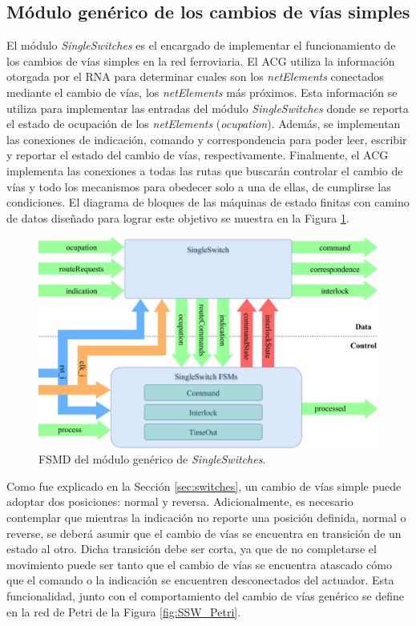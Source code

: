 \subsection{Módulo genérico de los cambios de vías simples}
	\label{sec:ACG_ssw}
	
	El módulo \textit{SingleSwitches} es el encargado de implementar el funcionamiento de los cambios de vías simples en la red ferroviaria. El ACG utiliza la información otorgada por el RNA para determinar cuales son los \textit{netElements} conectados mediante el cambio de vías, los \textit{netElements} más próximos. Esta información se utiliza para implementar las entradas del módulo \textit{SingleSwitches} donde se reporta el estado de ocupación de los \textit{netElements} (\textit{ocupation}). Además, se implementan las conexiones de indicación, comando y correspondencia para poder leer, escribir y reportar el estado del cambio de vías, respectivamente. Finalmente, el ACG implementa las conexiones a todas las rutas que buscarán controlar el cambio de vías y todo los mecanismos para obedecer solo a una de ellas, de cumplirse las condiciones. El diagrama de bloques de las máquinas de estado finitas con camino de datos diseñado para lograr este objetivo se muestra en la Figura \ref{fig:SSW_module}.
	
	\begin{figure}[H]
		\centering
		\includegraphics[width=1\textwidth]{Figuras/SSW_module}
		\centering\caption{FSMD del módulo genérico de \textit{SingleSwitches}.}
		\label{fig:SSW_module}
	\end{figure}
	
	Como fue explicado en la Sección \ref{sec:switches}, un cambio de vías simple puede adoptar dos posiciones: normal y reversa. Adicionalmente, es necesario contemplar que mientras la indicación no reporte una posición definida, normal o reverse, se deberá asumir que el cambio de vías se encuentra en transición de un estado al otro. Dicha transición debe ser corta, ya que de no completarse el movimiento puede ser tanto que el cambio de vías se encuentra atascado cómo que el comando o la indicación se encuentren desconectados del actuador. Esta funcionalidad, junto con el comportamiento del cambio de vías genérico se define en la red de Petri de la Figura \ref{fig:SSW_Petri}.
	
